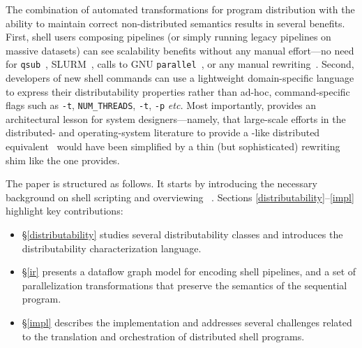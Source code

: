 \documentclass[sigplan,10pt,review,anonymous]{acmart}
\newcommand{\etc}{{\em etc.}\xspace}
\newcommand{\ttt}[1]{\texttt{\small #1}}
\begin{document}
The combination of automated transformations for program distribution with the ability to maintain correct non-distributed semantics results in several benefits.
First, shell users composing pipelines (or simply running legacy pipelines on massive datasets) can see scalability benefits without any manual effort---no need for \ttt{qsub}~\cite{gentzsch2001sun}, \textsc{SLURM}~\cite{yoo2003slurm}, calls to \textsc{GNU} \ttt{parallel}~\cite{Tange2011a}, or any manual rewriting~\cite{mapreduce:08, ciel:11, spark:12}.
Second, developers of new shell commands can use a lightweight domain-specific language to express their distributability properties rather than ad-hoc, command-specific flags such as {\tt -t},  {\tt NUM\_THREADS}, \ttt{-t}, \ttt{-p} \etc
Most importantly, \sys provides an architectural lesson for system designers---namely, that large-scale efforts in the distributed- and operating-system literature to provide a \unix-like distributed equivalent~\cite{ousterhout1988sprite, mullender1990amoeba, pike1990plan9, barak1998mosix} would have been simplified by a thin (but sophisticated) rewriting shim like the one \sys provides.


The paper is structured as follows.
It starts by introducing the necessary background on shell scripting and overviewing \sys~.
Sections \ref{distributability}--\ref{impl} highlight key
contributions:
\begin{itemize}

  \item
  \S\ref{distributability} studies several distributability classes and introduces the distributability characterization language.

  \item
  \S\ref{ir} presents a dataflow graph model for encoding shell pipelines, and a set of parallelization transformations that preserve the semantics of the sequential program.

  \item
    \S\ref{impl} describes the \sys implementation and addresses several challenges related to the translation and orchestration of distributed shell programs.
\end{itemize}
\end{document}
